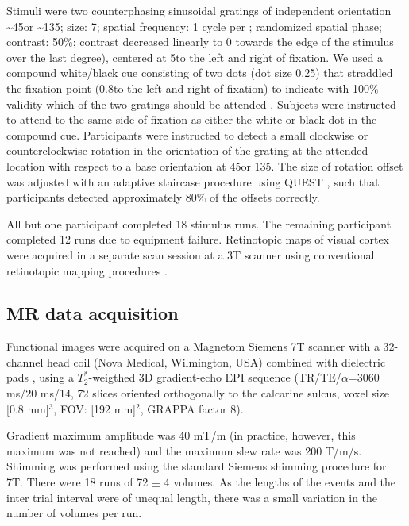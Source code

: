 \documentclass[9pt,lineno]{aperture}
\begin{document}
Stimuli were two counterphasing sinusoidal gratings of independent orientation \textasciitilde45\textdegree or \textasciitilde135\textdegree; size: 7\textdegree; spatial frequency: 1 cycle per \textdegree; randomized spatial phase; contrast: 50\%; contrast decreased linearly to 0 towards the edge of the stimulus over the last degree), centered at 5\textdegree to the left and right of fixation. We used a compound white/black cue consisting of two dots (dot size 0.25\textdegree) that straddled the fixation point (0.8\textdegree to the left and right of fixation) to indicate with 100\% validity which of the two gratings should be attended \citep{Jehee2011}. Subjects were instructed to attend to the same side of fixation as either the white or black dot in the compound cue.
Participants were instructed to detect a small clockwise or counterclockwise rotation in the orientation of the grating at the attended location with respect to a base orientation at 45\textdegree or 135\textdegree. The size of rotation offset was adjusted with an adaptive staircase procedure using QUEST \citep{Watson1983}, such that participants detected approximately 80\% of the offsets correctly. 

All but one participant completed 18 stimulus runs. The remaining participant completed 12 runs due to equipment failure.
Retinotopic maps of visual cortex were acquired in a separate scan session at a 3T scanner using conventional retinotopic mapping procedures \citep{Sereno1995,DeYoe1996,Engel1997}.

\subsection{MR data acquisition}
Functional images were acquired on a Magnetom Siemens 7T scanner with a 32-channel head coil (Nova Medical, Wilmington, USA) combined with dielectric pads \citep{Teeuwisse2012}, using a $T_2^*$-weigthed 3D gradient-echo EPI sequence \citep{Poser2010} (TR/TE/$\alpha$=3060 ms/20 ms/14\textdegree, 72 slices oriented orthogonally to the calcarine sulcus, voxel size [0.8 mm]$^3$, FOV: [192 mm]$^2$, GRAPPA factor 8).

Gradient maximum amplitude was 40 mT/m (in practice, however, this maximum was not reached) and the maximum slew rate was 200 T/m/s. Shimming was performed using the standard Siemens shimming procedure for 7T. There were 18 runs of 72 $\pm$ 4 volumes. As the lengths of the events and the inter trial interval were of unequal length, there was a small variation in the number of volumes per run.
\end{document}
